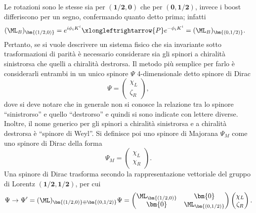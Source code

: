 Le rotazioni sono le stesse sia per $\bm{(1/2,0)}$ che per $\bm{(0,1/2)}$, invece i boost differiscono per un segno, confermando quanto detto prima; infatti
\begin{align}
    (\ML_B)_{\bm{(1/2,0)}} &= e^{i\phi_iK^i}\xlongleftrightarrow{P}e^{-\phi_iK^i} = (\ML_B)_{\bm{(0,1/2)}}.
\end{align}
Pertanto, se si vuole descrivere un sistema fisico che sia invariante sotto trasformazioni di parità è necessario considerare sia gli spinori a chiralità sinistrorsa che quelli a chiralità destrorsa. Il metodo più semplice per farlo è considerarli entrambi in un unico spinore $\Psi$ 4-dimensionale detto spinore di Dirac
\begin{equation}
    \Psi = 
    \begin{pmatrix}
        \chi_L \\
        \zeta_R
    \end{pmatrix},
\end{equation}
dove si deve notare che in generale non si conosce la relazione tra lo spinore ``sinistrorso'' e quello ``destrorso'' e quindi si sono indicate con lettere diverse. Inoltre, il nome generico per gli spinori a chiralità sinistrorsa e a chiralità destrorsa è ``spinore di Weyl''. Si definisce poi uno spinore di Majorana $\Psi_M$ come uno spinore di Dirac della forma
\begin{equation}
    \Psi_M = 
    \begin{pmatrix}
        \chi_L \\
        \chi_R
    \end{pmatrix}.
\end{equation}
Una spinore di Dirac trasforma secondo la rappresentazione vettoriale del gruppo di Lorentz $\bm{(1/2,1/2)}$, per cui
\begin{equation}
    \Psi\to\Psi' =(\ML)_{\bm{(1/2,0)}\oplus\bm{(0,1/2)}}\Psi =
    \begin{pmatrix}
        \ML_{\bm{(1/2,0)}} & \bm{0} \\
        \bm{0} & \ML_{\bm{(0,1/2)}}
    \end{pmatrix}
    \begin{pmatrix}
        \chi_L \\
        \zeta_R
    \end{pmatrix}.
\end{equation}

